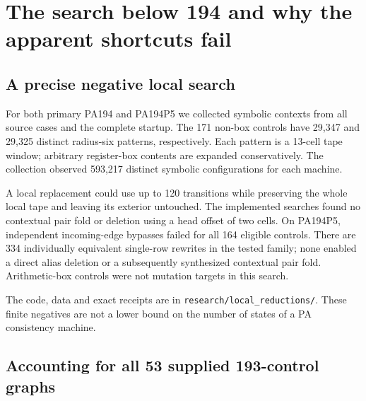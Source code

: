\documentclass[11pt,letterpaper]{article}
\newcommand{\file}[1]{\texttt{\nolinkurl{#1}}}
\begin{document}
\section{The search below 194 and why the apparent shortcuts fail}

\subsection{A precise negative local search}

For both primary PA194 and PA194P5 we collected symbolic contexts
from all source cases and the complete startup. The 171 non-box
controls have 29,347 and 29,325 distinct radius-six patterns,
respectively. Each pattern is a 13-cell tape window; arbitrary
register-box contents are expanded conservatively. The collection
observed 593,217 distinct symbolic configurations for each machine.

A local replacement could use up to 120 transitions while preserving
the whole local tape and leaving its exterior untouched. The
implemented searches found no contextual pair fold or deletion
using a head offset of two cells. On PA194P5, independent incoming-edge
bypasses failed for all 164 eligible controls. There are 334
individually equivalent single-row rewrites in the tested family;
none enabled a direct alias deletion or a subsequently synthesized
contextual pair fold. Arithmetic-box controls were not mutation
targets in this search.

The code, data and exact receipts are in
\file{research/local_reductions/}. These finite negatives are not
a lower bound on the number of states of a PA consistency machine.

\subsection{Accounting for all 53 supplied 193-control graphs}
\end{document}
